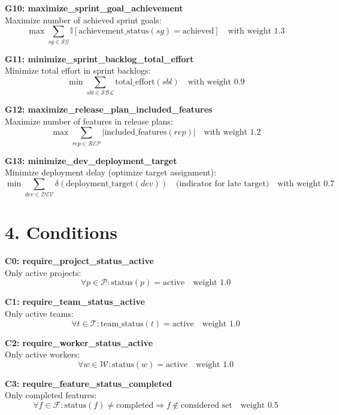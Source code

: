\documentclass[12pt]{article}
\begin{document}
    \item \textbf{G10: maximize\_sprint\_goal\_achievement} \\
    Maximize number of achieved sprint goals:
    \[
    \max \sum_{sg \in \mathcal{SG}} \mathbb{I}[\text{achievement\_status}(sg) = \text{achieved}] \quad \text{with weight } 1.3
    \]

    \item \textbf{G11: minimize\_sprint\_backlog\_total\_effort} \\
    Minimize total effort in sprint backlogs:
    \[
    \min \sum_{sbl \in \mathcal{SBL}} \text{total\_effort}(sbl) \quad \text{with weight } 0.9
    \]

    \item \textbf{G12: maximize\_release\_plan\_included\_features} \\
    Maximize number of features in release plans:
    \[
    \max \sum_{rep \in \mathcal{REP}} |\text{included\_features}(rep)| \quad \text{with weight } 1.2
    \]

    \item \textbf{G13: minimize\_dev\_deployment\_target} \\
    Minimize deployment delay (optimize target assignment):
    \[
    \min \sum_{dev \in \mathcal{DEV}} \delta(\text{deployment\_target}(dev)) \quad \text{(indicator for late target)} \quad \text{with weight } 0.7
    \]

\section{4. Conditions}
\item \textbf{C0: require\_project\_status\_active} \\
    Only active projects:
    \[
    \forall p \in \mathcal{P}: \text{status}(p) = \text{active} \quad \text{weight } 1.0
    \]

    \item \textbf{C1: require\_team\_status\_active} \\
    Only active teams:
    \[
    \forall t \in \mathcal{T}: \text{team\_status}(t) = \text{active} \quad \text{weight } 1.0
    \]

    \item \textbf{C2: require\_worker\_status\_active} \\
    Only active workers:
    \[
    \forall w \in \mathcal{W}: \text{status}(w) = \text{active} \quad \text{weight } 1.0
    \]

    \item \textbf{C3: require\_feature\_status\_completed} \\
    Only completed features:
    \[
    \forall f \in \mathcal{F}: \text{status}(f) \neq \text{completed} \Rightarrow f \notin \text{considered set} \quad \text{weight } 0.5
    \]
\end{document}
